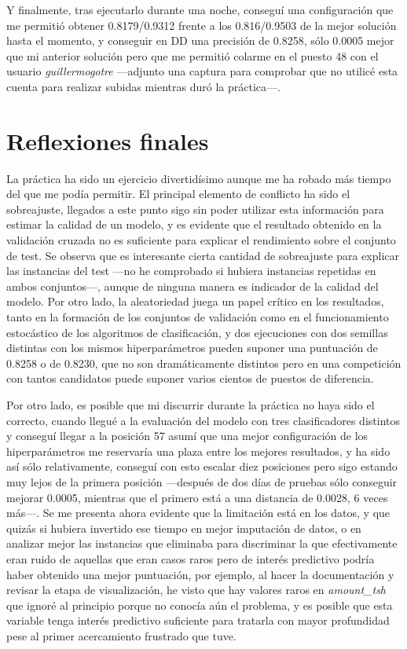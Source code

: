 \documentclass{article}
\newcommand{\img}[2]{
\noindent\makebox[\textwidth][c]{\texttt{[image: imgs/\#1]}}%
}
\begin{document}
Y finalmente, tras ejecutarlo durante una noche, conseguí una configuración que me permitió obtener 0.8179/0.9312 frente a los 0.816/0.9503 de la mejor solución hasta el momento, y conseguir en DD una precisión de 0.8258, sólo 0.0005 mejor que mi anterior solución pero que me permitió colarme en el puesto 48 con el usuario \textit{guillermogotre} ---adjunto una captura para comprobar que no utilicé esta cuenta para realizar subidas mientras duró la práctica---.

\img{g21}{0.8}
\img{g22}{0.8}
\img{g23}{0.8}

\section{Reflexiones finales}

La práctica ha sido un ejercicio divertidísimo aunque me ha robado más tiempo del que me podía permitir. El principal elemento de conflicto ha sido el sobreajuste, llegados a este punto sigo sin poder utilizar esta información para estimar la calidad de un modelo, y es evidente que el resultado obtenido en la validación cruzada no es suficiente para explicar el rendimiento sobre el conjunto de test. Se observa que es interesante cierta cantidad de sobreajuste para explicar las instancias del test ---no he comprobado si hubiera instancias repetidas en ambos conjuntos---, aunque de ninguna manera es indicador de la calidad del modelo. Por otro lado, la aleatoriedad juega un papel crítico en los resultados, tanto en la formación de los conjuntos de validación como en el funcionamiento estocástico de los algoritmos de clasificación, y dos ejecuciones con dos semillas distintas con los mismos hiperparámetros pueden suponer una puntuación de 0.8258 o de 0.8230, que no son dramáticamente distintos pero en una competición con tantos candidatos puede suponer varios cientos de puestos de diferencia.

Por otro lado, es posible que mi discurrir durante la práctica no haya sido el correcto, cuando llegué a la evaluación del modelo con tres clasificadores distintos y conseguí llegar a la posición 57 asumí que una mejor configuración de los hiperparámetros me reservaría una plaza entre los mejores resultados, y ha sido así sólo relativamente, conseguí con esto escalar diez posiciones pero sigo estando muy lejos de la primera posición ---después de dos días de pruebas sólo conseguir mejorar 0.0005, mientras que el primero está a una distancia de 0.0028, 6 veces más---. Se me presenta ahora evidente que la limitación está en los datos, y que quizás si hubiera invertido ese tiempo en mejor imputación de datos, o en analizar mejor las instancias que eliminaba para discriminar la que efectivamente eran ruido de aquellas que eran casos raros pero de interés predictivo podría haber obtenido una mejor puntuación, por ejemplo, al hacer la documentación y revisar la etapa de visualización, he visto que hay valores raros en \textit{amount\_tsh} que ignoré al principio porque no conocía aún el problema, y es posible que esta variable tenga interés predictivo suficiente para tratarla con mayor profundidad pese al primer acercamiento frustrado que tuve.
\end{document}
